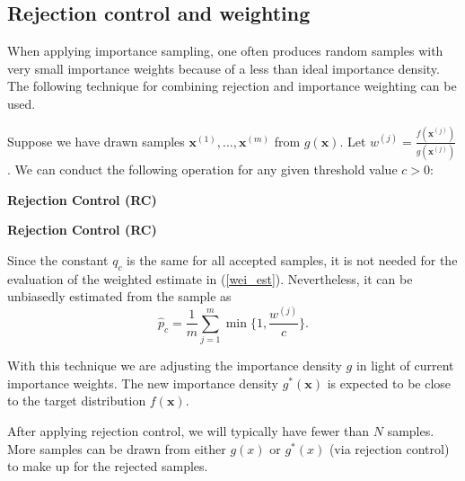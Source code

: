 \documentclass[times, utf8, diplomski]{fer}
\begin{document}
\subsection{Rejection control and weighting}
When applying importance sampling, one often produces random samples with very small importance weights because of a less than ideal importance density. The following technique for combining rejection and importance weighting can be used. 

Suppose we have drawn samples $\mathbf{x}^{(1)}, \ldots, \mathbf{x}^{(m)}$ from $g(\mathbf{x})$. Let $w^{(j)} =  \frac{f(\mathbf{x}^{(j)})}{g(\mathbf{x}^{(j)})}$. We can conduct the following operation for any given threshold value $c > 0$:
\vspace{5mm}

\begin{algorithm}[H]
\textbf{Rejection Control (RC)}\\
 \caption{\textbf{Rejection Control (RC)}}
 \label{RC}
\end{algorithm}
\vspace{5mm}

Since the constant $q_c$ is the same for all accepted samples, it is not needed for the  evaluation of the weighted estimate in (\ref{wei_est}). Nevertheless, it can be unbiasedly estimated \cite{Liu} from the sample as 
\begin{equation}
\hat{p}_{c} = \frac{1}{m} \sum_{j = 1}^{m} \min  \Big \{ {1, \frac{w^{(j)}}{c}} \Big \}.
\end{equation}

With this technique we are adjusting the importance density $g$  in light of current importance weights. The new importance density $g^{*}(\mathbf{x})$ is expected to be close to the target distribution $f(\mathbf{x})$.

After applying rejection control, we will typically have fewer than $N$ samples. More samples can be drawn from either $g(x)$ or $g^{*}(x)$ (via rejection control) to make up for the rejected samples. 
\end{document}
